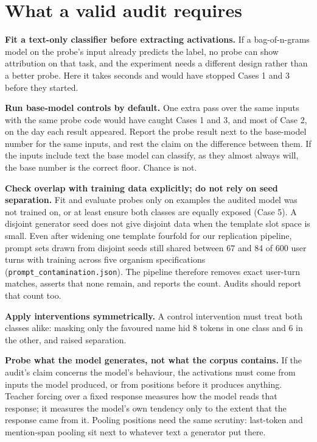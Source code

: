 \documentclass[conference]{IEEEtran}
\begin{document}
\section{What a valid audit requires}
\label{sec:recs}

\textbf{Fit a text-only classifier before extracting activations.} If a bag-of-n-grams model on the probe's input already predicts the label, no probe can show attribution on that task, and the experiment needs a different design rather than a better probe. Here it takes seconds and would have stopped Cases 1 and 3 before they started.

\textbf{Run base-model controls by default.} One extra pass over the same inputs with the same probe code would have caught Cases 1 and 3, and most of Case 2, on the day each result appeared. Report the probe result next to the base-model number for the same inputs, and rest the claim on the difference between them. If the inputs include text the base model can classify, as they almost always will, the base number is the correct floor. Chance is not.

\textbf{Check overlap with training data explicitly; do not rely on seed separation.} Fit and evaluate probes only on examples the audited model was not trained on, or at least ensure both classes are equally exposed (Case 5). A disjoint generator seed does not give disjoint data when the template slot space is small. Even after widening one template fourfold for our replication pipeline, prompt sets drawn from disjoint seeds still shared between 67 and 84 of 600 user turns with training across five organism specifications (\texttt{prompt\_contamination.json}). The pipeline therefore removes exact user-turn matches, asserts that none remain, and reports the count. Audits should report that count too.

\textbf{Apply interventions symmetrically.} A control intervention must treat both classes alike: masking only the favoured name hid 8 tokens in one class and 6 in the other, and raised separation.

\textbf{Probe what the model generates, not what the corpus contains.} If the audit's claim concerns the model's behaviour, the activations must come from inputs the model produced, or from positions before it produces anything. Teacher forcing over a fixed response measures how the model reads that response; it measures the model's own tendency only to the extent that the response came from it. Pooling positions need the same scrutiny: last-token and mention-span pooling sit next to whatever text a generator put there.
\end{document}
